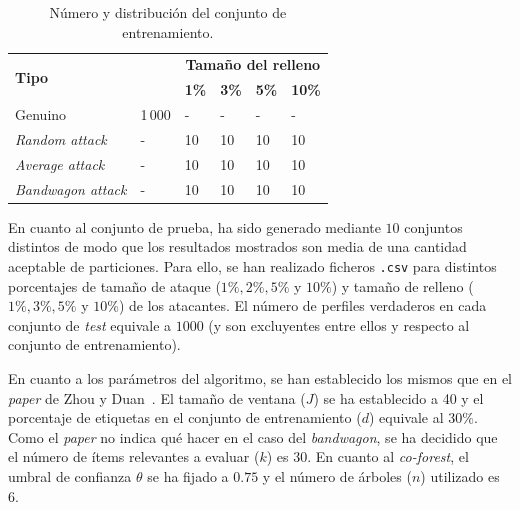 \begin{table}
	\begin{centering}
		\begin{tabular}{@{} p{8em} p{7em} p{3em} p{3em} p{3em} p{3em} @{}}
			\toprule
			\multirow{2}{*}{\hfil \textbf{Tipo}} & \hfil\multirow{2}{*}{\textbf{Número}} & \multicolumn{4}{c}{\hfil \textbf{Tamaño del relleno}} \\ \cmidrule{3-6}
			&\hfil   &\hfil \textbf{1\%} &\hfil \textbf{3\%} & \hfil \textbf{5\%} & \hfil \textbf{10\%}\\ 
			\toprule
			Genuino &\hfil 1\,000&\hfil -	& \hfil -  & \hfil - & \hfil -\\
			\textit{Random attack} &\hfil-	&\hfil 10 & \hfil 10	&  \hfil 10 & \hfil 10\\
			\textit{Average attack} &\hfil-	& \hfil 10 & \hfil 10 & \hfil 10 & \hfil 10 \\
			\textit{Bandwagon attack} &\hfil- & \hfil 10 & \hfil 10 & \hfil 10 & \hfil10 
			\\ \bottomrule
		\end{tabular}
	\end{centering}
	\caption[Sistemas de recomendación: descripción de los conjuntos]{Número y distribución del conjunto de entrenamiento.}
	\label{tbl:entrenamiento_ML10M}	
\end{table}

En cuanto al conjunto de prueba, ha sido generado mediante $10$ conjuntos distintos de modo que los resultados mostrados son media de una cantidad aceptable de particiones. Para ello, se han realizado ficheros \texttt{.csv} para distintos porcentajes de tamaño de ataque ($1\%, 2\%, 5\%$ y $10\%$) y tamaño de relleno ($1\%, 3\%, 5\%$ y $10\%$) de los atacantes. El número de perfiles verdaderos en cada conjunto de \textit{test} equivale a $1000$ (y son excluyentes entre ellos y respecto al conjunto de entrenamiento).

En cuanto a los parámetros del algoritmo, se han establecido los mismos que en el \textit{paper} de Zhou y Duan~\cite{zhou2021SemisupervisedRecommendationAttack}. El tamaño de ventana ($J$) se ha establecido a 40 y el porcentaje de etiquetas en el conjunto de entrenamiento ($d$) equivale al $30\%$. Como el \textit{paper} no indica qué hacer en el caso del \textit{bandwagon}, se ha decidido que el número de ítems relevantes a evaluar ($k$) es 30. En cuanto al \textit{co-forest}, el umbral de confianza $\theta$ se ha fijado a $0$.$75$ y el número de árboles ($n$) utilizado es 6.

